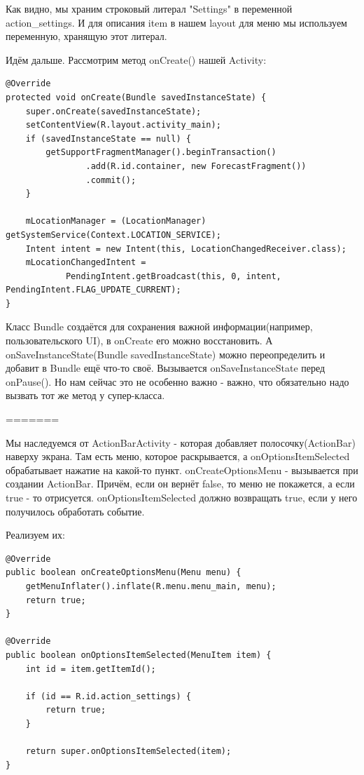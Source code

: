 \documentclass[12 pt]{article}
\begin{document}
    Как видно, мы храним строковый литерал "Settings" в переменной action\_settings. И для описания item в нашем layout для меню мы используем переменную, хранящую этот литерал.
    
    Идём дальше. Рассмотрим метод onCreate() нашей Activity:
    
    \begin{lstlisting}
@Override
protected void onCreate(Bundle savedInstanceState) {
    super.onCreate(savedInstanceState);
    setContentView(R.layout.activity_main);
    if (savedInstanceState == null) {
        getSupportFragmentManager().beginTransaction()
                .add(R.id.container, new ForecastFragment())
                .commit();
    }

    mLocationManager = (LocationManager) getSystemService(Context.LOCATION_SERVICE);
    Intent intent = new Intent(this, LocationChangedReceiver.class);
    mLocationChangedIntent =
            PendingIntent.getBroadcast(this, 0, intent, PendingIntent.FLAG_UPDATE_CURRENT);
}   
    \end{lstlisting}  
    
    Класс Bundle создаётся для сохранения важной информации(например, пользовательского UI), в onCreate его можно восстановить. А onSaveInstanceState(Bundle savedInstanceState) можно переопределить и добавит в Bundle ещё что-то своё. Вызывается onSaveInstanceState перед onPause(). Но нам сейчас это не особенно важно - важно, что обязательно надо вызвать тот же метод у супер-класса.
    
=======
    
    Мы наследуемся от ActionBarActivity - которая добавляет полосочку(ActionBar) наверху экрана. Там есть меню, которое раскрывается, а onOptionsItemSelected обрабатывает нажатие на какой-то пункт. onCreateOptionsMenu - вызывается при создании ActionBar. Причём, если он вернёт false, то меню не покажется, а если true - то отрисуется. onOptionsItemSelected должно возвращать true, если у него получилось обработать событие.
    
    Реализуем их:
    
    \begin{lstlisting}
@Override
public boolean onCreateOptionsMenu(Menu menu) {
    getMenuInflater().inflate(R.menu.menu_main, menu);
    return true;
}

@Override
public boolean onOptionsItemSelected(MenuItem item) {
    int id = item.getItemId();

    if (id == R.id.action_settings) {
        return true;
    }

    return super.onOptionsItemSelected(item);
}    
    \end{lstlisting} 
    
\end{document}
